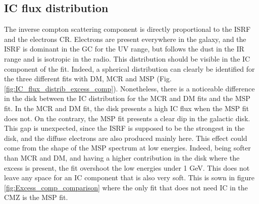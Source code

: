 \subsection{IC flux distribution}
The inverse compton scattering component is directly proportional to the ISRF and the electrons CR. Electrons are present everywhere in the galaxy, and the ISRF is dominant in the GC for the UV range, but follows the dust in the IR range and is isotropic in the radio. This distribution should be visible in the IC component of the fit.
Indeed, a spherical distribution can clearly be identified for the three different fits with DM, MCR and MSP (Fig. \ref{fig:IC_flux_distrib_excess_comp}). Nonetheless, there is a noticeable difference in the disk between the IC distribution for the MCR and DM fits and the MSP fit. In the MCR and DM fit, the disk presents a high IC flux when the MSP fit does not. On the contrary, the MSP fit presents a clear dip in the galactic disk. This gap is unexpected, since the ISRF is supposed to be the strongest in the disk, and the diffuse electrons are also produced mainly here. This effect could come from the shape of the MSP spectrum at low energies. Indeed, being softer than MCR and DM, and having a higher contribution in the disk where the excess is present, the fit overshoot the low energies under 1 GeV. This does not leave any space for an IC component that is also very soft. This is sown in figure \ref{fig:Excess_comp_comparison} where the only fit that does not need IC in the CMZ is the MSP fit.

